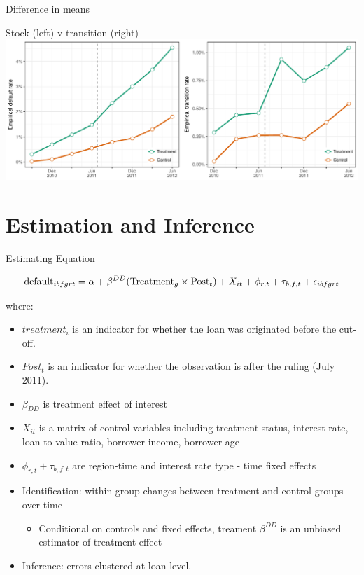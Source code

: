 \documentclass[ignorenonframetext,aspectratio=169]{beamer}
\providecommand{\tightlist}{%
  \setlength{\itemsep}{0pt}\setlength{\parskip}{0pt}}
\begin{document}
\begin{frame}{Difference in means}

Stock (left) v transition (right)
\includegraphics[width=\linewidth]{empirical_wide}

\end{frame}

\section{Estimation and Inference}\label{estimation-and-inference}

\begin{frame}{Estimating Equation}

\begin{equation}
\textup{{default}}_{ibfgrt}=\alpha+\beta^{DD}(\textup{{Treatment}}_{g}\times\textup{Post}_{t})+X_{it} +\phi_{r,t}+\tau_{b,f,t}+\epsilon_{ibfgrt}
\end{equation}

where:

\begin{itemize}
\item
  \(treatment_i\) is an indicator for whether the loan was originated
  before the cut-off.
\item
  \(Post_t\) is an indicator for whether the observation is after the
  ruling (July 2011).
\item
  \(\beta_{DD}\) is treatment effect of interest
\item
  \(X_{it}\) is a matrix of control variables including treatment
  status, interest rate, loan-to-value ratio, borrower income, borrower
  age
\item
  \(\phi_{r,t}+\tau_{b,f,t}\) are region-time and interest rate type -
  time fixed effects
\item
  Identification: within-group changes between treatment and control
  groups over time

  \begin{itemize}
  \tightlist
  \item
    Conditional on controls and fixed effects, treament \(\beta^{DD}\)
    is an unbiased estimator of treatment effect
  \end{itemize}
\item
  Inference: errors clustered at loan level.
\end{itemize}

\end{frame}
\end{document}
